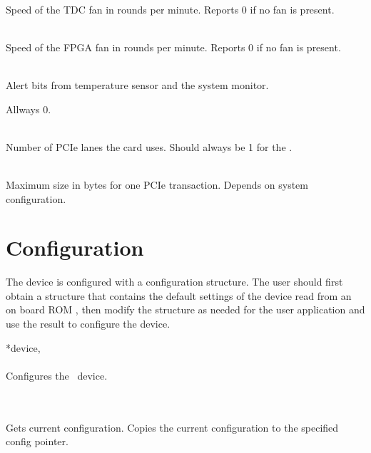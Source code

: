			\\
			Speed of the TDC fan in rounds per minute. Reports 0 if no fan is present.\par

			\\
			Speed of the FPGA fan in rounds per minute. Reports 0 if no fan is present.\par

			\\
			Alert bits from temperature sensor and the system monitor.
			\par

			\par
			Allways 0. 

			\\
			Number of PCIe lanes the card uses. Should always be 1 for the \deviceName. \par

			\\
			Maximum size in bytes for one PCIe transaction. Depends on system configuration.\par

	\section{Configuration}

		The device is configured with a configuration structure. 
		The user should first obtain a structure that contains the default settings of the device read from an on board ROM , 
		then modify the structure as needed for the user application and use the result to configure the device.\par

		 {*device,} \\ \\
		Configures the \deviceName\ device.\par

		 \\ \\
		Gets current configuration. Copies the current configuration to the specified config pointer.\par

